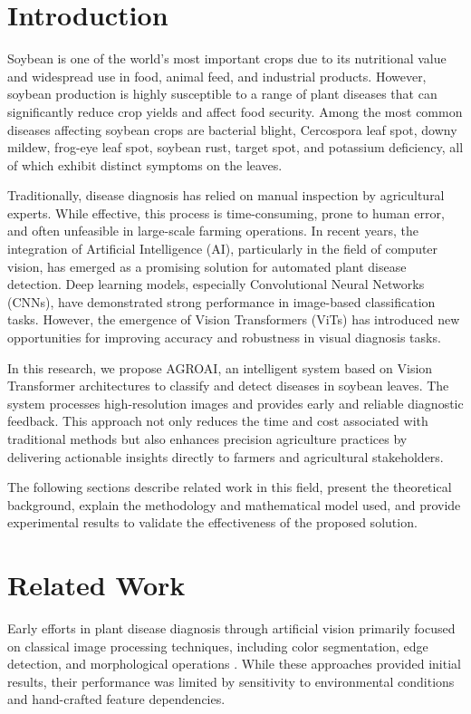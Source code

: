 \documentclass[preprint,12pt]{elsarticle}
\begin{document}
\section{Introduction}

Soybean is one of the world's most important crops due to its nutritional value and widespread use in food, animal feed, and industrial products. However, soybean production is highly susceptible to a range of plant diseases that can significantly reduce crop yields and affect food security. Among the most common diseases affecting soybean crops are bacterial blight, Cercospora leaf spot, downy mildew, frog-eye leaf spot, soybean rust, target spot, and potassium deficiency, all of which exhibit distinct symptoms on the leaves.

Traditionally, disease diagnosis has relied on manual inspection by agricultural experts. While effective, this process is time-consuming, prone to human error, and often unfeasible in large-scale farming operations. In recent years, the integration of Artificial Intelligence (AI), particularly in the field of computer vision, has emerged as a promising solution for automated plant disease detection. Deep learning models, especially Convolutional Neural Networks (CNNs), have demonstrated strong performance in image-based classification tasks. However, the emergence of Vision Transformers (ViTs) has introduced new opportunities for improving accuracy and robustness in visual diagnosis tasks.

In this research, we propose AGROAI, an intelligent system based on Vision Transformer architectures to classify and detect diseases in soybean leaves. The system processes high-resolution images and provides early and reliable diagnostic feedback. This approach not only reduces the time and cost associated with traditional methods but also enhances precision agriculture practices by delivering actionable insights directly to farmers and agricultural stakeholders.

The following sections describe related work in this field, present the theoretical background, explain the methodology and mathematical model used, and provide experimental results to validate the effectiveness of the proposed solution.

\section{Related Work}

Early efforts in plant disease diagnosis through artificial vision primarily focused on classical image processing techniques, including color segmentation, edge detection, and morphological operations \cite{Patil2011LeafDiseaseDetection}. While these approaches provided initial results, their performance was limited by sensitivity to environmental conditions and hand-crafted feature dependencies.
\end{document}
